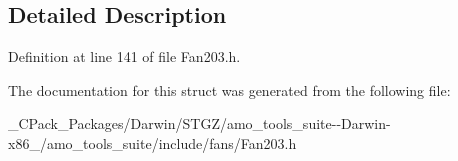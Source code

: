 \subsection{Detailed Description}


Definition at line 141 of file Fan203.\+h.



The documentation for this struct was generated from the following file\+:\begin{DoxyCompactItemize}
\item 
\+\_\+\+C\+Pack\+\_\+\+Packages/\+Darwin/\+S\+T\+G\+Z/amo\+\_\+tools\+\_\+suite-\/-\/\+Darwin-\/x86\+\_/amo\+\_\+tools\+\_\+suite/include/fans/Fan203.\+h\end{DoxyCompactItemize}
